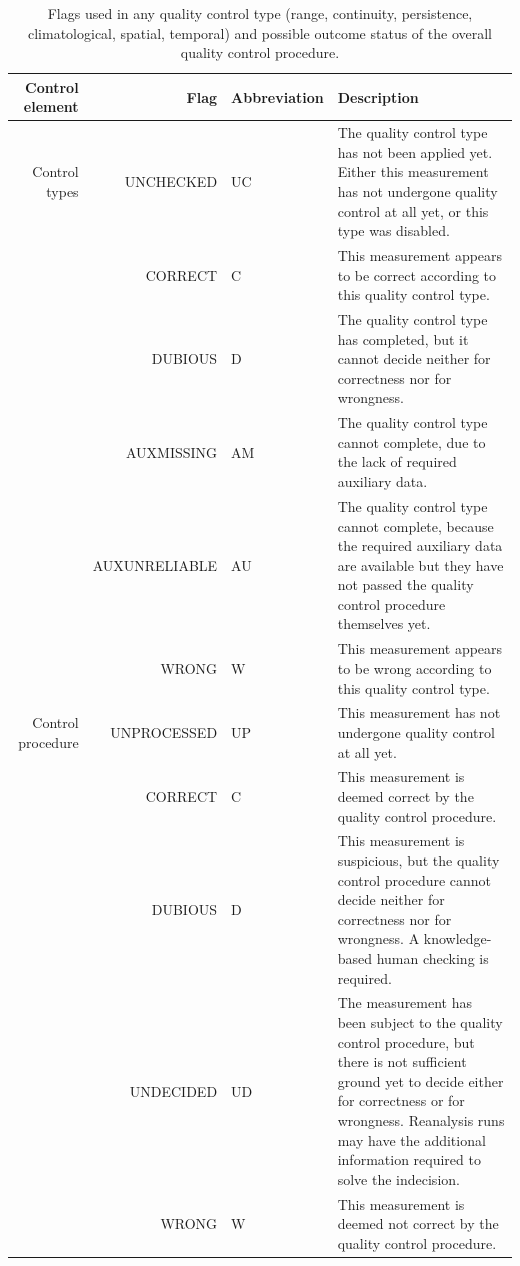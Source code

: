 \documentclass[authoryear,preprint,review,12pt]{elsarticle}
\begin{document}
\begin{table}[]
    \begin{scriptsize}
    \centering
    \begin{tabular}{r r l p{7cm}}
    \hline
    Control element & Flag & Abbreviation & Description \\
    \hline
	Control types & UNCHECKED     & UC & The quality control type has not been applied yet. Either this measurement has not undergone quality control at all yet, or this type was disabled.\\
	& CORRECT       & C  & This measurement appears to be correct according to this quality control type. \\
	& DUBIOUS       & D  & The quality control type has completed, but it cannot decide neither for correctness nor for wrongness. \\
	& AUXMISSING    & AM & The quality control type cannot complete, due to the lack of required auxiliary data. \\
	& AUXUNRELIABLE & AU & The quality control type cannot complete, because the required auxiliary data are available but they have not passed the quality control procedure themselves yet. \\
	& WRONG         & W  & This measurement appears to be wrong according to this quality control type. \\
 
    \hline

	Control procedure & UNPROCESSED & UP & This measurement has not undergone quality control at all yet.\\
	& CORRECT     & C  & This measurement is deemed correct by the quality control procedure.\\
	& DUBIOUS     & D  & This measurement is suspicious, but the quality control procedure cannot decide neither for correctness nor for wrongness. A knowledge-based human checking is required. \\
	& UNDECIDED   & UD & The measurement has been subject to the quality control procedure, but there is not sufficient ground yet to decide either for correctness or for wrongness. Reanalysis runs may have the additional information required to solve the indecision.\\
	& WRONG       & W  & This measurement is deemed not correct by the quality control procedure.\\
    \hline    
    \end{tabular}
    \caption{Flags used in any quality control type (range, continuity, persistence, climatological, spatial, temporal) and possible outcome status of the overall quality control procedure.}
    \label{tab:flagsSummary}
    \end{scriptsize}
\end{table}
\end{document}
